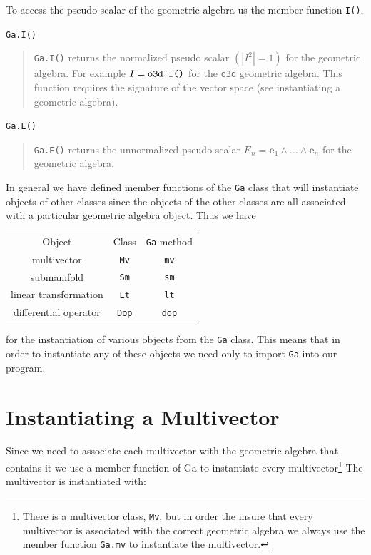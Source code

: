 \documentclass[12pt]{report}
\newcommand{\bm}[1]{\boldsymbol{#1}}
\newcommand{\lp}{\left (}
\newcommand{\rp}{\right )}
\newcommand{\abs}[1]{\left |{#1}\right |}
\newcommand{\W}{\wedge}
\newcommand{\paren}[1]{\lp {#1} \rp}
\newcommand{\T}[1]{\texttt{#1}}
\begin{document}
To access the pseudo scalar of the geometric algebra us the member function \T{I()}.

\T{Ga.I()}
\begin{quote}
    \T{Ga.I()} returns the normalized pseudo scalar $\paren{\abs{I^{2}}=1}$ for the
    geometric algebra. For example $I = \mbox{\T{o3d.I()}}$ for the \T{o3d} geometric
    algebra.  This function requires the signature of the vector space (see instantiating
    a geometric algebra).
\end{quote}

\T{Ga.E()}
\begin{quote}
    \T{Ga.E()} returns the unnormalized pseudo scalar $E_{n} = \bm{e}_{1}\W\dots\W\bm{e}_{n}$
    for the geometric algebra.
\end{quote}

In general we have defined member functions of the \T{Ga} class that will instantiate objects
of other classes since the objects of the other classes are all associated with a particular
geometric algebra object.  Thus we have
\begin{center}
\begin{tabular}{ccc}
    Object &  Class & \T{Ga} method \\
    multivector & \T{Mv} & \T{mv} \\
    submanifold & \T{Sm} & \T{sm} \\
    linear transformation & \T{Lt} & \T{lt} \\
    differential operator & \T{Dop} & \T{dop}
\end{tabular}
\end{center}
for the instantiation of various objects from the \T{Ga} class.  This means that in order to
instantiate any of these objects we need only to import \T{Ga} into our program.

\section{Instantiating a Multivector}

Since we need to associate each multivector with the geometric algebra that contains it
we use a member function of Ga to instantiate every multivector\footnote{There is a
multivector class, \T{Mv}, but in order the insure that every multivector is associated
with the correct geometric algebra we always use the member function \T{Ga.mv} to instantiate
the multivector.}  The multivector is instantiated with:
\end{document}
